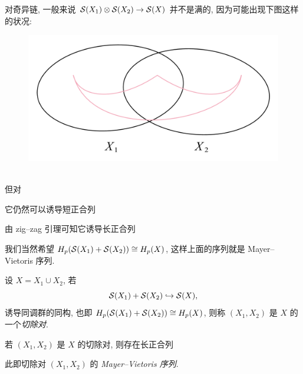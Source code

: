 对奇异链, 一般来说 $ \mathcal{S}(X_1)\otimes\mathcal{S}(X_2)\to\mathcal{S}(X) $ 并不是满的, 因为可能出现下图这样的状况:
\begin{figure}[htbp]
	\centering
	\includegraphics[width=0.3\linewidth]{figures/Sec11-1.png}
\end{figure}\\
但对
\begin{center}
\end{center}
它仍然可以诱导短正合列
\begin{center}
\end{center}
由 zig--zag 引理可知它诱导长正合列
\begin{center}
\end{center}
我们当然希望 $ H_p(\mathcal{S}(X_1)+\mathcal{S}(X_2))\cong H_p(X) $, 这样上面的序列就是 Mayer--Vietoris 序列.

\begin{Definition}[切除对]
	设 $ X=X_1\cup X_2 $, 若
	\[
		\mathcal{S}(X_1)+\mathcal{S}(X_2)\hookrightarrow\mathcal{S}(X),
	\]
	诱导同调群的同构, 也即 $ H_p(\mathcal{S}(X_1)+\mathcal{S}(X_2))\cong H_p(X) $, 则称 $ (X_1,X_2) $ 是 $ X $ 的一个\emph{切除对}.
\end{Definition}

\begin{Theorem}
	若 $ (X_1,X_2) $ 是 $ X $ 的切除对, 则存在长正合列
	\begin{center}
	\end{center}
	此即切除对 $ (X_1,X_2) $ 的 \emph{Mayer--Vietoris 序列}.
\end{Theorem}

